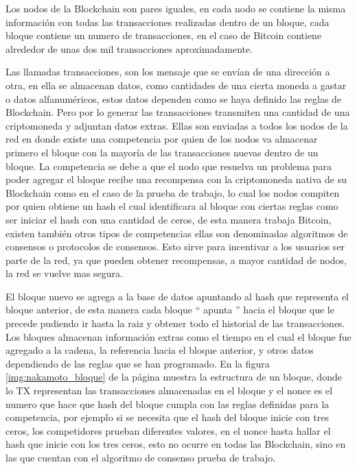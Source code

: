 Los nodos de la  Blockchain son pares iguales, en cada nodo se contiene la misma información con todas las transacciones realizadas
dentro de un bloque, cada bloque contiene un numero de transacciones, en el caso de Bitcoin contiene alrededor de unas dos mil transacciones aproximadamente.
\cite[]{retamal_Blockchain_2017}

Las llamadas transacciones, son los mensaje que se envían de una dirección a otra, en ella 
 se almacenan datos, como cantidades de una cierta moneda a gastar o datos alfanuméricos, estos datos dependen 
 como se haya definido las reglas de Blockchain. Pero por lo generar las transacciones transmiten una cantidad de una criptomoneda y adjuntan 
 datos extras. Ellas son enviadas a todos los nodos de la red en donde existe una competencia por quien de los  nodos va almacenar primero el bloque con la 
 mayoría de las transacciones nuevas dentro de un bloque. La competencia se debe a que el nodo que resuelva un problema para poder agregar el bloque 
 recibe una recompensa con la criptomoneda nativa de su  Blockchain  como en el caso de la prueba de trabajo, lo cual los nodos compiten
 por quien obtiene un hash el cual identificara al bloque  con ciertas reglas como ser iniciar el hash con una cantidad de ceros, de esta manera trabaja 
 Bitcoin, existen también otros tipos de competencias ellas son denominadas algoritmos de consensos o protocolos de consensos.
Esto sirve para incentivar a los usuarios ser parte de la red, ya que pueden obtener recompensas, a mayor cantidad de nodos, la red se vuelve mas segura.

El bloque nuevo se agrega a la base de datos apuntando al hash que representa el bloque anterior, de esta manera
cada bloque “ apunta ” hacia el bloque que le precede  pudiendo ir hasta la raiz y obtener todo el historial de las transacciones.
Los bloques almacenan información extras como el tiempo en el cual el bloque fue agregado a la cadena, la referencia hacia el bloque anterior, y otros 
datos dependiendo de las reglas que se han programado.
En la figura \ref{img:nakamoto_bloque} de la  página \pageref{img:nakamoto_bloque} muestra la estructura de un bloque, donde lo TX representan 
las transacciones almacenadas en el bloque y el nonce es el numero que hace que hash del bloque cumpla con las reglas definidas para 
la competencia, por ejemplo si se necesita que el hash del bloque inicie con tres ceros, los competidores prueban diferentes valores, en el nonce
hasta hallar el hash que inicie con los tres ceros, esto no ocurre en todas las Blockchain, sino en las que cuentan con
el algoritmo de consenso prueba de trabajo. \cite[]{nakamoto_bitcoin_2008,drescher_Blockchain_2017,kelly_investigation_2018,ethereum_org_transactions_2021}

